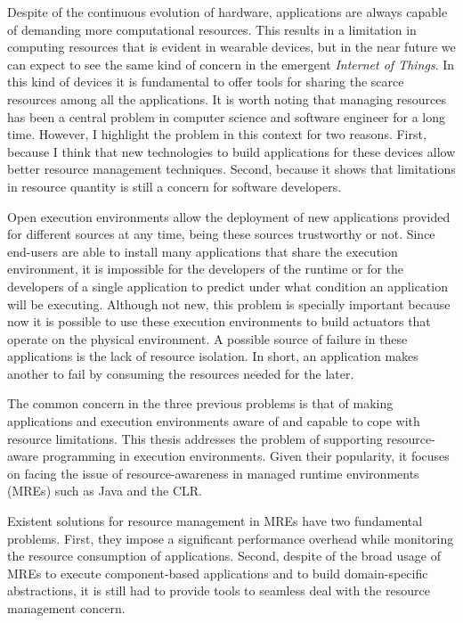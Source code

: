 Despite of the continuous evolution of hardware, applications are always capable of demanding more computational resources.
This results in a limitation in computing resources that is evident in wearable devices, but in the near future we can expect to see the same kind of concern in the emergent \textit{Internet of Things}.
In this kind of devices it is fundamental to offer tools for sharing the scarce resources among all the applications.
It is worth noting that managing resources has been a central problem in computer science and software engineer for a long time.
However, I highlight the problem in this context for two reasons.
First, because I think that new technologies to build applications for these devices allow better resource management techniques.
Second, because it shows that limitations in resource quantity is still a concern for software developers.

Open execution environments allow the deployment of new applications provided for different sources at any time, being these sources trustworthy or not.
Since end-users are able to install many applications that share the execution environment, it is impossible for the developers of the runtime or for the developers of a single application to predict under what condition an application will be executing.
Although not new, this problem is specially important because now it is possible to use these execution environments to build actuators that operate on the physical environment.
A possible source of failure in these applications is the lack of resource isolation.
In short, an application makes another to fail by consuming the resources needed for the later.

The common concern in the three previous problems is that of making applications and execution environments aware of and capable to cope with resource limitations. 
This thesis addresses the problem of supporting resource-aware programming in execution environments.
Given their popularity, it focuses on facing the issue of resource-awareness in managed runtime environments (MREs) such as Java and the CLR.

Existent solutions for resource management in MREs have two fundamental problems.
First, they impose a significant performance overhead while monitoring the resource consumption of applications.
Second, despite of the broad usage of MREs to execute component-based applications and to build domain-specific 
abstractions, it is still had to provide tools to seamless deal with the resource management concern.

